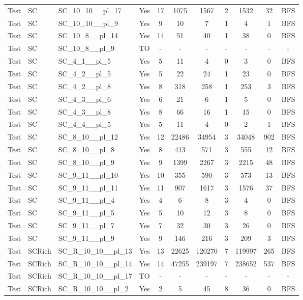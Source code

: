 \documentclass{article}
\begin{document}
\begin{tabular}{lllcccccccc}
Test & SC & SC\_10\_10\_\_pl\_17 & Yes & 17 & 1075 & 1567 & 2 & 1532 & 32 & BFS \\
Test & SC & SC\_10\_10\_\_pl\_9 & Yes & 9 & 10 & 7 & 1 & 4 & 1 & BFS \\
Test & SC & SC\_10\_8\_\_pl\_14 & Yes & 14 & 51 & 40 & 1 & 38 & 0 & BFS \\
Test & SC & SC\_10\_8\_\_pl\_9 & TO & - & - & - & - & - & - & - \\
Test & SC & SC\_4\_1\_\_pl\_5 & Yes & 5 & 11 & 4 & 0 & 3 & 0 & BFS \\
Test & SC & SC\_4\_2\_\_pl\_5 & Yes & 5 & 22 & 24 & 1 & 23 & 0 & BFS \\
Test & SC & SC\_4\_2\_\_pl\_8 & Yes & 8 & 318 & 258 & 1 & 253 & 3 & BFS \\
Test & SC & SC\_4\_3\_\_pl\_6 & Yes & 6 & 21 & 6 & 1 & 5 & 0 & BFS \\
Test & SC & SC\_4\_3\_\_pl\_8 & Yes & 8 & 66 & 16 & 1 & 15 & 0 & BFS \\
Test & SC & SC\_4\_4\_\_pl\_5 & Yes & 5 & 11 & 4 & 0 & 2 & 1 & BFS \\
Test & SC & SC\_8\_10\_\_pl\_12 & Yes & 12 & 22486 & 34954 & 3 & 34048 & 902 & BFS \\
Test & SC & SC\_8\_10\_\_pl\_8 & Yes & 8 & 413 & 571 & 3 & 555 & 12 & BFS \\
Test & SC & SC\_8\_10\_\_pl\_9 & Yes & 9 & 1399 & 2267 & 3 & 2215 & 48 & BFS \\
Test & SC & SC\_9\_11\_\_pl\_10 & Yes & 10 & 355 & 590 & 3 & 573 & 13 & BFS \\
Test & SC & SC\_9\_11\_\_pl\_11 & Yes & 11 & 907 & 1617 & 3 & 1576 & 37 & BFS \\
Test & SC & SC\_9\_11\_\_pl\_4 & Yes & 4 & 6 & 8 & 3 & 4 & 0 & BFS \\
Test & SC & SC\_9\_11\_\_pl\_5 & Yes & 5 & 10 & 12 & 3 & 8 & 0 & BFS \\
Test & SC & SC\_9\_11\_\_pl\_7 & Yes & 7 & 32 & 30 & 3 & 26 & 0 & BFS \\
Test & SC & SC\_9\_11\_\_pl\_9 & Yes & 9 & 146 & 216 & 3 & 209 & 3 & BFS \\
Test & SCRich & SC\_R\_10\_10\_\_pl\_13 & Yes & 13 & 22625 & 120270 & 7 & 119997 & 265 & BFS \\
Test & SCRich & SC\_R\_10\_10\_\_pl\_14 & Yes & 14 & 47255 & 239197 & 7 & 238652 & 537 & BFS \\
Test & SCRich & SC\_R\_10\_10\_\_pl\_17 & TO & - & - & - & - & - & - & - \\
Test & SCRich & SC\_R\_10\_10\_\_pl\_2 & Yes & 2 & 5 & 45 & 8 & 36 & 0 & BFS \\

\end{tabular}
\end{document}
